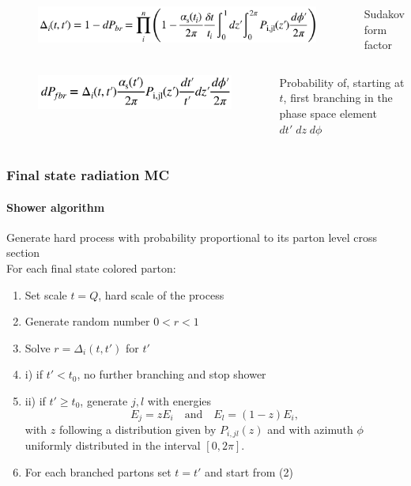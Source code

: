 \documentclass[aspectratio=43]{beamer}
\begin{document}
\begin{frame}
	\begin{columns} 
	
	
	\begin{figure}
		\includegraphics[width = 6 cm]{plots/probability4.png}
	\end{figure}
	
	
	\footnotesize Sudakov form factor
	
	\end{columns}
	
	\begin{columns} 
		
		\column{0.4\textwidth}
		
		\begin{figure}
			\includegraphics[width = 4 cm]{plots/probability5.png}
		\end{figure}
		
		\column{0.6\textwidth}
		
		\footnotesize Probability of, starting at $t$, first branching in the phase space element $dt'\; dz\; d\phi$
		
	\end{columns}

\end{frame}

\begin{frame}

	\frametitle{Final state radiation MC}
	\framesubtitle{Shower algorithm}
	
	\footnotesize Generate hard process with probability proportional to its parton level cross section \\
	\footnotesize For each final state colored parton:
	\begin{enumerate} 
		\item \footnotesize Set scale $t = Q$, hard scale of the process
		\item \footnotesize Generate random number $0 < r < 1$
		\item \footnotesize Solve $r = \Delta_{i}(t, t')$ for $t'$
		\item \footnotesize i) if $t' < t_{0}$, no further branching and stop shower
		\item \footnotesize ii) if $t' \geq t_{0}$, generate $j, l$ with energies $$E_{j} = zE_{i} \quad \textrm{and}\quad E_{l} = (1 - z)E_{i}, $$ with $z$ following a distribution given by  $P_{i, jl}(z)$ and with azimuth $\phi$ uniformly distributed in the interval $[0, 2\pi]$.
		\item \footnotesize For each branched partons set $t = t'$ and start from (2)
	\end{enumerate}

\end{frame}
\end{document}
